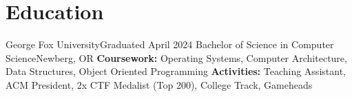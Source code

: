 \section{Education}
  \resumeSubHeadingListStart
    \resumeEducationSubheading
        {George Fox University}{Graduated April 2024}
        {Bachelor of Science in Computer Science}{Newberg, OR}
        {\textbf{Coursework:} Operating Systems, Computer Architecture, Data Structures, Object Oriented Programming}
        {\textbf{Activities:} Teaching Assistant, ACM President, 2x CTF Medalist (Top 200), College Track, Gameheads}
  \resumeSubHeadingListEnd


